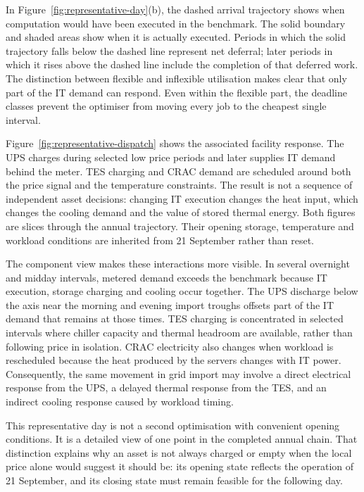 In Figure~\ref{fig:representative-day}(b), the dashed arrival trajectory shows
when computation would have been executed in the benchmark. The solid boundary
and shaded areas show when it is actually executed. Periods in which the solid
trajectory falls below the dashed line represent net deferral; later periods in
which it rises above the dashed line include the completion of that deferred
work. The distinction between flexible and inflexible utilisation makes clear
that only part of the IT demand can respond. Even within the flexible part, the
deadline classes prevent the optimiser from moving every job to the cheapest
single interval.

Figure~\ref{fig:representative-dispatch} shows the associated facility response.
The UPS charges during selected low price periods and later supplies IT demand
behind the meter. TES charging and CRAC demand are scheduled around both the
price signal and the temperature constraints. The result is not a sequence of
independent asset decisions: changing IT execution changes the heat input, which
changes the cooling demand and the value of stored thermal energy. Both figures
are slices through the annual trajectory. Their opening storage, temperature
and workload conditions are inherited from 21 September rather than reset.

The component view makes these interactions more visible. In several overnight
and midday intervals, metered demand exceeds the benchmark because IT execution,
storage charging and cooling occur together. The UPS discharge below the axis
near the morning and evening import troughs offsets part of the IT demand that
remains at those times. TES charging is concentrated in selected intervals where
chiller capacity and thermal headroom are available, rather than following price
in isolation. CRAC electricity also changes when workload is rescheduled because
the heat produced by the servers changes with IT power. Consequently, the same
movement in grid import may involve a direct electrical response from the UPS,
a delayed thermal response from the TES, and an indirect cooling response caused
by workload timing.

This representative day is not a second optimisation with convenient opening
conditions. It is a detailed view of one point in the completed annual chain.
That distinction explains why an asset is not always charged or empty when the
local price alone would suggest it should be: its opening state reflects the
operation of 21 September, and its closing state must remain feasible for the
following day.

